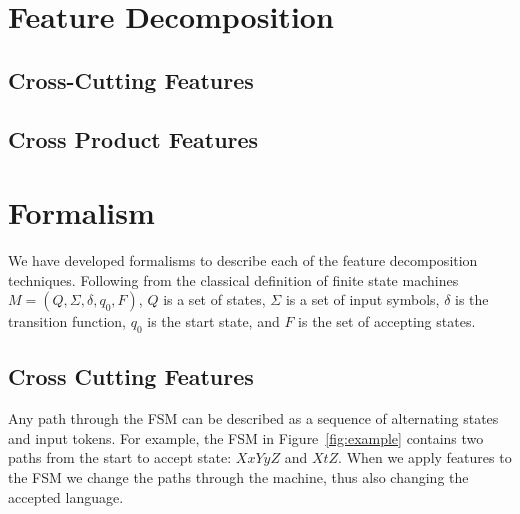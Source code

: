 \documentclass[sigplan,anonymous,review]{acmart}
\begin{document}
\section{Feature Decomposition}\label{sec:decomp}
\subsection{Cross-Cutting Features}

\subsection{Cross Product Features}

\section{Formalism}\label{sec:formal}
We have developed formalisms to describe each of the feature decomposition techniques. Following from the classical definition of finite state machines $M = (Q, \Sigma, \delta, q_0, F)$, $Q$ is a set of states, $\Sigma$ is a set of input symbols, $\delta$ is the transition function, $q_0$ is the start state, and $F$ is the set of accepting states. \\

\subsection{Cross Cutting Features}
Any path through the FSM can be described as a sequence of alternating states and input tokens. For example, the FSM in Figure~\ref{fig:example} contains two paths from the start to accept state: $XxYyZ$ and $XtZ$. When we apply features to the FSM we change the paths through the machine, thus also changing the accepted language.
\end{document}
